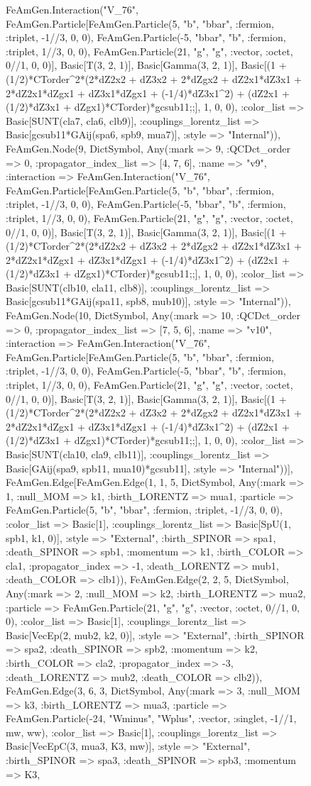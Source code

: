 \documentclass{revtex4}
\begin{document}
\begin{figure}[!htb]
\begin{center}
{FeAmGen.Interaction("V_76", FeAmGen.Particle[FeAmGen.Particle(5, "b", "bbar", :fermion, :triplet, -1//3, 0, 0), FeAmGen.Particle(-5, "bbar", "b", :fermion, :triplet, 1//3, 0, 0), FeAmGen.Particle(21, "g", "g", :vector, :octet, 0//1, 0, 0)], Basic[T(3, 2, 1)], Basic[Gamma(3, 2, 1)], Basic[(1 + (1/2)*CTorder^2*(2*dZ2x2 + dZ3x2 + 2*dZgx2 + dZ2x1*dZ3x1 + 2*dZ2x1*dZgx1 + dZ3x1*dZgx1 + (-1/4)*dZ3x1^2) + (dZ2x1 + (1/2)*dZ3x1 + dZgx1)*CTorder)*gcsub11;;], 1, 0, 0), :color_list => Basic[SUNT(cla7, cla6, clb9)], :couplings_lorentz_list => Basic[gcsub11*GAij(spa6, spb9, mua7)], :style => "Internal")), FeAmGen.Node(9, Dict{Symbol, Any}(:mark => 9, :QCDct_order => 0, :propagator_index_list => [4, 7, 6], :name => "v9", :interaction => FeAmGen.Interaction("V_76", FeAmGen.Particle[FeAmGen.Particle(5, "b", "bbar", :fermion, :triplet, -1//3, 0, 0), FeAmGen.Particle(-5, "bbar", "b", :fermion, :triplet, 1//3, 0, 0), FeAmGen.Particle(21, "g", "g", :vector, :octet, 0//1, 0, 0)], Basic[T(3, 2, 1)], Basic[Gamma(3, 2, 1)], Basic[(1 + (1/2)*CTorder^2*(2*dZ2x2 + dZ3x2 + 2*dZgx2 + dZ2x1*dZ3x1 + 2*dZ2x1*dZgx1 + dZ3x1*dZgx1 + (-1/4)*dZ3x1^2) + (dZ2x1 + (1/2)*dZ3x1 + dZgx1)*CTorder)*gcsub11;;], 1, 0, 0), :color_list => Basic[SUNT(clb10, cla11, clb8)], :couplings_lorentz_list => Basic[gcsub11*GAij(spa11, spb8, mub10)], :style => "Internal")), FeAmGen.Node(10, Dict{Symbol, Any}(:mark => 10, :QCDct_order => 0, :propagator_index_list => [7, 5, 6], :name => "v10", :interaction => FeAmGen.Interaction("V_76", FeAmGen.Particle[FeAmGen.Particle(5, "b", "bbar", :fermion, :triplet, -1//3, 0, 0), FeAmGen.Particle(-5, "bbar", "b", :fermion, :triplet, 1//3, 0, 0), FeAmGen.Particle(21, "g", "g", :vector, :octet, 0//1, 0, 0)], Basic[T(3, 2, 1)], Basic[Gamma(3, 2, 1)], Basic[(1 + (1/2)*CTorder^2*(2*dZ2x2 + dZ3x2 + 2*dZgx2 + dZ2x1*dZ3x1 + 2*dZ2x1*dZgx1 + dZ3x1*dZgx1 + (-1/4)*dZ3x1^2) + (dZ2x1 + (1/2)*dZ3x1 + dZgx1)*CTorder)*gcsub11;;], 1, 0, 0), :color_list => Basic[SUNT(cla10, cla9, clb11)], :couplings_lorentz_list => Basic[GAij(spa9, spb11, mua10)*gcsub11], :style => "Internal"))], FeAmGen.Edge[FeAmGen.Edge(1, 1, 5, Dict{Symbol, Any}(:mark => 1, :null_MOM => k1, :birth_LORENTZ => mua1, :particle => FeAmGen.Particle(5, "b", "bbar", :fermion, :triplet, -1//3, 0, 0), :color_list => Basic[1], :couplings_lorentz_list => Basic[SpU(1, spb1, k1, 0)], :style => "External", :birth_SPINOR => spa1, :death_SPINOR => spb1, :momentum => k1, :birth_COLOR => cla1, :propagator_index => -1, :death_LORENTZ => mub1, :death_COLOR => clb1)), FeAmGen.Edge(2, 2, 5, Dict{Symbol, Any}(:mark => 2, :null_MOM => k2, :birth_LORENTZ => mua2, :particle => FeAmGen.Particle(21, "g", "g", :vector, :octet, 0//1, 0, 0), :color_list => Basic[1], :couplings_lorentz_list => Basic[VecEp(2, mub2, k2, 0)], :style => "External", :birth_SPINOR => spa2, :death_SPINOR => spb2, :momentum => k2, :birth_COLOR => cla2, :propagator_index => -3, :death_LORENTZ => mub2, :death_COLOR => clb2)), FeAmGen.Edge(3, 6, 3, Dict{Symbol, Any}(:mark => 3, :null_MOM => k3, :birth_LORENTZ => mua3, :particle => FeAmGen.Particle(-24, "Wminus", "Wplus", :vector, :singlet, -1//1, mw, ww), :color_list => Basic[1], :couplings_lorentz_list => Basic[VecEpC(3, mua3, K3, mw)], :style => "External", :birth_SPINOR => spa3, :death_SPINOR => spb3, :momentum => K3, }
\end{center}
\end{figure}
\end{document}
